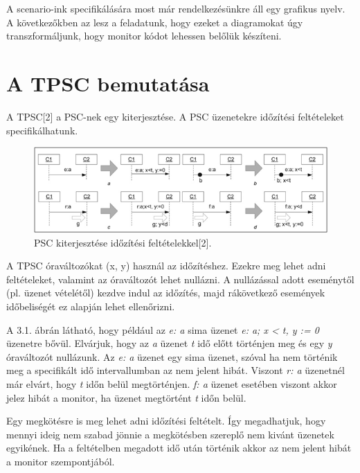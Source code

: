A scenario-ink specifikálására most már rendelkezésünkre áll egy grafikus nyelv.
A következőkben az lesz a feladatunk, hogy ezeket a diagramokat úgy transzformáljunk, hogy monitor kódot lehessen belőlük készíteni.


\clearpage\section{A TPSC bemutatása}
A TPSC[2] a PSC-nek egy kiterjesztése.
A PSC üzenetekre időzítési feltételeket specifikálhatunk.

\begin{figure}[!ht]
    \centering
    \includegraphics[width=150mm, keepaspectratio]{figures/4abra.png}
    \caption{PSC kiterjesztése időzítési feltételekkel[2].}
\end{figure}

A TPSC óraváltozókat (x, y) használ az időzítéshez.
Ezekre meg lehet adni feltételeket, valamint az óraváltozót lehet nullázni.
A nullázással adott eseménytől (pl. üzenet vételétől) kezdve indul az időzítés, majd rákövetkező események időbeliségét ez alapján lehet ellenőrizni.

A 3.1. ábrán látható, hogy például az \textit{e: a} sima üzenet \textit{e: a; x < t, y := 0} üzenetre bővül.
Elvárjuk, hogy az \textit{a} üzenet \textit{t} idő előtt történjen meg és egy \textit{y} óraváltozót nullázunk.
Az \textit{e: a} üzenet egy sima üzenet, szóval ha nem történik meg a specifikált idő intervallumban az nem jelent hibát.
Viszont \textit{r: a} üzenetnél már elvárt, hogy \textit{t} időn belül megtörténjen. \textit{f: a} üzenet esetében viszont akkor jelez hibát a monitor, ha üzenet megtörtént \textit{t} időn belül.

Egy megkötésre is meg lehet adni időzítési feltételt.
Így megadhatjuk, hogy mennyi ideig nem szabad jönnie a megkötésben szereplő nem kivánt üzenetek egyikének.
Ha a feltételben megadott idő után történik akkor az nem jelent hibát a monitor szempontjából.

